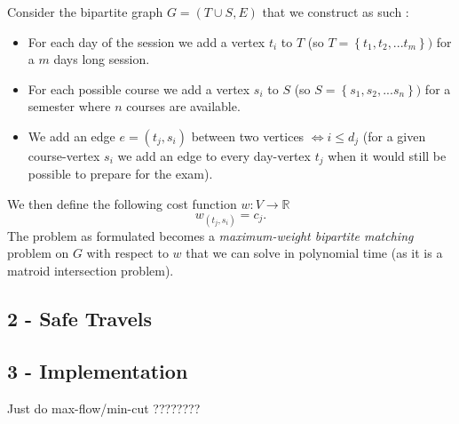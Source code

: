 \documentclass{article}
\begin{document}
\begin{flushleft}
Consider the bipartite graph $G = (T \cup S, E)$ that we construct as such :
\begin{itemize}
    \item For each day of the session we add a vertex $t_i$ to $T$ (so $T = \left\lbrace t_1, t_2, ... t_m \right\rbrace)$ for a $m$ days long session.
    \item For each possible course we add a vertex $s_i$ to $S$ (so $S = \left\lbrace s_1, s_2, ... s_n \right\rbrace)$ for a semester where $n$ courses are available.
    \item We add an edge $e=(t_j,s_i)$ between two vertices $\iff i \leq d_j$ (for a given course-vertex $s_i$ we add an edge to every day-vertex $t_j$ when it would still be possible to prepare for the exam).
\end{itemize}
We then define the following cost function $w : V \rightarrow \mathbb{R}$
\[ w_{(t_j,s_i)} = c_j. \]
The problem as formulated becomes a \textit{maximum-weight bipartite matching} problem on $G$ with respect to $w$ that we can solve in polynomial time (as it is a matroid intersection problem).
\newpage

\subsection*{2 - Safe Travels}

\newpage

\subsection{3 - Implementation}

Just do max-flow/min-cut ???????? 

\end{flushleft}
\end{document}
